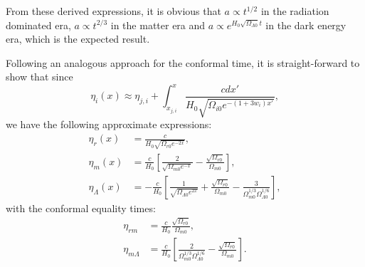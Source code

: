 \documentclass{aa}
\begin{document}
From these derived expressions, it is obvious that $a\propto t^{1/2}$ in the radiation dominated era, $a\propto t^{2/3}$ in the matter era and $a\propto e^{H_0\sqrt{\Omega_{\Lambda0}}t}$ in the dark energy era, which is the expected result.

Following an analogous approach for the conformal time, it is straight-forward to show that since
\begin{equation}
  \eta_i(x) \approx \eta_{j,i} + \int_{x_{j,i}}^{x}\frac{cdx'}{H_0\sqrt{\Omega_{i0}e^{-(1+3w_i)x'}}},
\end{equation}
we have the following approximate expressions:
\begin{align}
  \eta_r(x) &= \frac{c}{H_0\sqrt{\Omega_{r0}e^{-2x}}},
  \\
  \eta_m(x) &= \frac{c}{H_0}\left[\frac{2}{\sqrt{\Omega_{m0}e^{-x}}} - \frac{\sqrt{\Omega_{r0}}}{\Omega_{m0}} \right],
  \\
  \eta_\Lambda(x) &= -\frac{c}{H_0}\left[\frac{1}{\sqrt{\Omega_{\Lambda0}e^{2x}}} +\frac{\sqrt{\Omega_{r0}}}{\Omega_{m0}} - \frac{3}{\Omega_{m0}^{1/3}\Omega_{\Lambda0}^{1/6}} \right],
\end{align}
with the conformal equality times:
\begin{align}
  \eta_{rm} &= \frac{c}{H_0}\frac{\sqrt{\Omega_{r0}}}{\Omega_{m0}},
  \\
  \eta_{m\Lambda} &= \frac{c}{H_0}\left[\frac{2}{\Omega_{m0}^{1/3}\Omega_{\Lambda0}^{1/6}} - \frac{\sqrt{\Omega_{r0}}}{\Omega_{m0}}\right].
\end{align}
\end{document}
